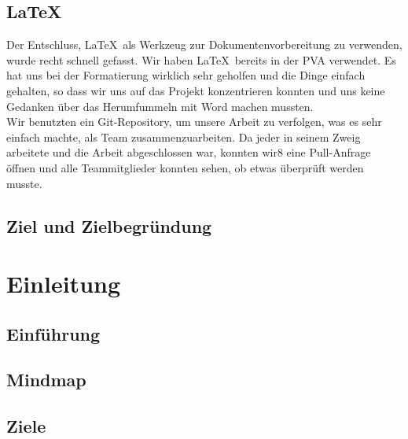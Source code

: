 \subsection{\LaTeX\ }
Der Entschluss, \LaTeX\  als Werkzeug zur Dokumentenvorbereitung zu verwenden, wurde recht schnell gefasst. Wir haben \LaTeX\  bereits in
 der PVA verwendet. Es hat uns bei der Formatierung wirklich sehr geholfen und die Dinge einfach gehalten,
 so dass wir uns auf das Projekt konzentrieren konnten und uns keine Gedanken über das Herumfummeln mit Word machen mussten.
\\
Wir benutzten ein Git-Repository, um unsere Arbeit zu verfolgen, was es sehr einfach machte, als Team zusammenzuarbeiten. Da jeder in seinem Zweig arbeitete und die Arbeit abgeschlossen war,
 konnten wir8 eine Pull-Anfrage öffnen und alle Teammitglieder konnten sehen, ob etwas überprüft werden musste.
\subsection{Ziel und Zielbegründung}

\section{Einleitung}
\subsection{Einführung}

\newpage
\subsection{Mindmap}
\subsection{Ziele} \label{introduction}
